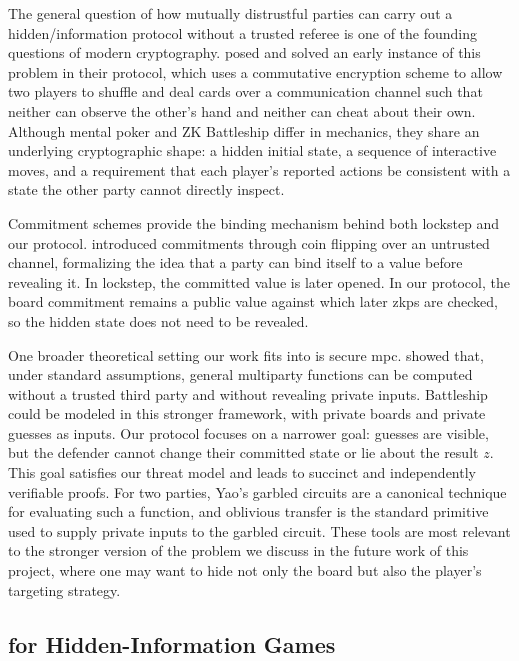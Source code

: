 The general question of how mutually distrustful parties can carry out a hidden\-/information protocol without a trusted referee is one of the founding questions of modern cryptography. \Textcite{shamir81} posed and solved an early instance of this problem in their  protocol, which uses a commutative encryption scheme to allow two players to shuffle and deal cards over a communication channel such that neither can observe the other's hand and neither can cheat about their own. Although mental poker and \gls{ZK} Battleship differ in mechanics, they share an underlying cryptographic shape: a hidden initial state, a sequence of interactive moves, and a requirement that each player's reported actions be consistent with a state the other party cannot directly inspect.

Commitment schemes provide the binding mechanism behind both lockstep and our protocol. \Textcite{blum83} introduced commitments through coin flipping over an untrusted channel, formalizing the idea that a party can bind itself to a value before revealing it. In lockstep, the committed value is later opened. In our protocol, the board commitment remains a public value against which later \glspl{zkp} are checked, so the hidden state does not need to be revealed.

One broader theoretical setting our work fits into is secure \gls{mpc}. \Textcite{goldreich87} showed that, under standard assumptions, general multiparty functions can be computed without a trusted third party and without revealing private inputs. Battleship could be modeled in this stronger framework, with private boards and private guesses as inputs. Our protocol focuses on a narrower goal: guesses are visible, but the defender cannot change their committed state or lie about the result $z$. This goal satisfies our threat model and leads to succinct and independently verifiable proofs. For two parties, Yao's garbled circuits \cite{yao86} are a canonical technique for evaluating such a function, and oblivious transfer \cite{rabin81,even85} is the standard primitive used to supply private inputs to the garbled circuit. These tools are most relevant to the stronger version of the problem we discuss in the future work of this project, where one may want to hide not only the board but also the player's targeting strategy. 

\subsection{ for Hidden-Information Games}
\label{subsec:hiddenInformationGames}

